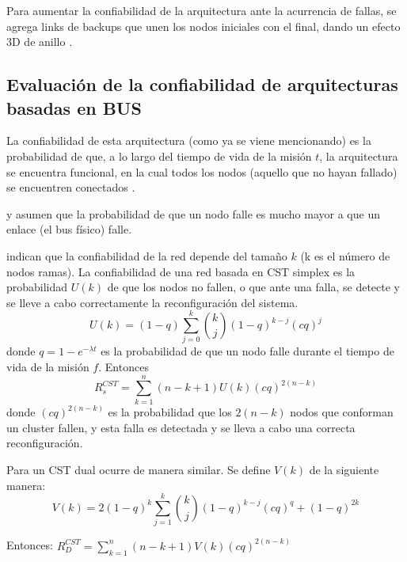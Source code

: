 Para aumentar la confiabilidad de la arquitectura ante la acurrencia de fallas, se agrega links de backups que unen los nodos iniciales con el final, dando un efecto 3D de anillo \citep{Tai99}.

\subsection{Evaluación de la confiabilidad de arquitecturas basadas en BUS}
La confiabilidad de esta arquitectura (como ya se viene mencionando) es la probabilidad de que, a lo largo del tiempo de vida de la misión $t$, la arquitectura se encuentra funcional, en la cual todos los nodos (aquello que no hayan fallado) se encuentren conectados \citep{Tai99}.

\citep{Tai99} y \citep{Chau99} asumen que la probabilidad de que un nodo falle es mucho mayor a que un enlace (el bus físico) falle.

\cite{Tai99} indican que la confiabilidad de la red depende del tamaño $k$ (k es el número de nodos ramas). La confiabilidad de una red basada en \ac{CST} simplex es la probabilidad $U(k)$ de que los nodos no fallen, o que ante una falla, se detecte y se lleve a cabo correctamente la reconfiguración del sistema. $$U(k) = (1-q) \sum_{j=0}^{k} {{k}\choose{j}} (1-q)^{k-j} (cq)^j $$ donde $q = 1-e^{-\lambda t}$ es la probabilidad de que un nodo falle durante el tiempo de vida de la misión $f$. Entonces $$R_s^{CST} = \sum_{k=1}^n (n-k+1)U(k)(cq)^{2(n-k)}$$ donde $(cq)^{2(n-k)}$ es la probabilidad que los  $2(n-k)$ nodos que conforman un cluster fallen, y esta falla es detectada y se lleva a cabo una correcta reconfiguración.

Para un \ac{CST} dual ocurre de manera similar. Se define $V(k)$ de la siguiente manera: $$V(k) = 2(1-q)^k \sum_{j=1}^k {{k}\choose{j}} (1-q)^{k-j} (cq)^q + (1-q)^{2k}$$

Entonces:  $R_D^{CST} =  \sum_{k=1}^n (n-k+1) V(k) (cq)^{2(n-k)}$

